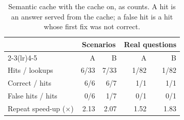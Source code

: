 \begin{table}[t]
\caption{Semantic cache with the cache on, as counts. A hit is an answer served from the cache; a false hit is a hit whose first fix was not correct.}
\label{tab:cache}
\centering
\footnotesize
\setlength{\tabcolsep}{3pt}
\begin{tabular}{@{}lrrrr@{}}
\toprule
 & \multicolumn{2}{c}{Scenarios} & \multicolumn{2}{c}{Real questions} \\
\cmidrule(lr){2-3}\cmidrule(lr){4-5}
 & A & B & A & B \\
\midrule
Hits / lookups & 6/33 & 7/33 & 1/82 & 1/82 \\
Correct / hits & 6/6 & 6/7 & 1/1 & 1/1 \\
False hits / hits & 0/6 & 1/7 & 0/1 & 0/1 \\
Repeat speed-up ($\times$) & 2.13 & 2.07 & 1.52 & 1.83 \\
\bottomrule
\end{tabular}
\end{table}

